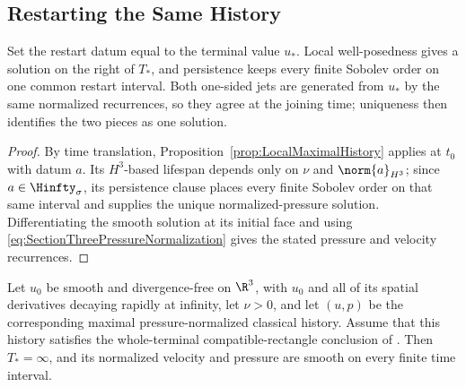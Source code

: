 \subsection{Restarting the Same History}\label{sub:RestartingTheSameHistory}

Set the restart datum equal to the terminal value \(u_*\).
Local well-posedness gives a solution on the right of \(T_*\), and persistence keeps every finite Sobolev order on one common restart interval.
Both one-sided jets are generated from \(u_*\) by the same normalized recurrences, so they agree at the joining time; uniqueness then identifies the two pieces as one solution.


\begin{proof}
By time translation, Proposition~\ref{prop:LocalMaximalHistory} applies at \(t_0\) with datum \(a\).
Its \(H^3\)-based lifespan depends only on \(\nu\) and \(\norm{a}_{H^3}\); since \(a\in\Hinfty_\sigma\), its persistence clause places every finite Sobolev order on that same interval and supplies the unique normalized-pressure solution.
Differentiating the smooth solution at its initial face and using \eqref{eq:SectionThreePressureNormalization} gives the stated pressure and velocity recurrences.
\end{proof}

\begin{theorem}\label{thm:CompatibleIntersectionClosure}
Let \(u_0\) be smooth and divergence-free on \(\R^3\), with \(u_0\) and all of its spatial derivatives decaying rapidly at infinity, let \(\nu>0\), and let \((u,p)\) be the corresponding maximal pressure-normalized classical history.
Assume that this history satisfies the whole-terminal compatible-rectangle conclusion of .
Then \(T_*=\infty\), and its normalized velocity and pressure are smooth on every finite time interval.
\end{theorem}

